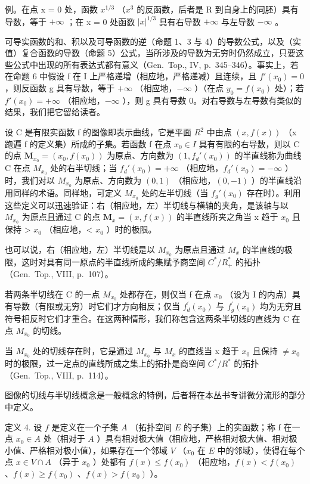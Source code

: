 例。在点 x = 0 处，函数 \(x^{1/3}\) （\(x^{3}\) 的反函数，后者是 R 到自身上的同胚）具有导数，等于 \(+\infty\) ；在 x = 0 处函数 \(|x|^{1/3}\) 具有右导数 \(+\infty\) 与左导数 \(-\infty\) 。

可导实函数的和、积以及可导函数的逆（命题 1、3 与 4）的导数公式，以及（实值）复合函数的导数（命题 5）公式，当所涉及的导数为无穷时仍然成立，只要这些公式中出现的所有表达式都有意义（Gen.~Top., IV, p.~345--346）。事实上，若在命题 6 中假设 f 在 I 上严格递增（相应地，严格递减）且连续，且 \(f'(x_{0}) = 0\) ，则反函数 g 具有导数，等于 \(+\infty\) （相应地，\(-\infty\) ）（在点 \(y_{0} = f(x_{0})\) 处）；若 \(f'(x_{0}) = +\infty\) （相应地，\(-\infty\) ），则 g 具有导数 0。对右导数与左导数有类似的结果，我们把它留给读者。

设 C 是有限实函数 f 的图像即表示曲线，它是平面 \(R^{2}\) 中由点 \((x, f(x))\) （x 跑遍 f 的定义集）所成的子集。若函数 f 在点 \(x_{0} \in I\) 具有有限的右导数，则以 C 的点 \(\mathbf{M}_{x_{0}} = (x_{0}, f(x_{0}))\) 为原点、方向数为 \((1, f_{d}'(x_{0}))\) 的半直线称为曲线 C 在点 \(M_{x_{0}}\) 处的右半切线；当 \(f_{d}'(x_{0}) = +\infty\) （相应地，\(f_{d}'(x_{0}) = -\infty\) ）时，我们对以 \(M_{x_{0}}\) 为原点、方向数为 \((0, 1)\) （相应地，\((0, -1)\) ）的半直线沿用同样的术语。同样地，可定义 \(M_{x_{0}}\) 处的左半切线（当 \(f_{g}'(x_{0})\) 存在时）。利用这些定义可以迅速验证：右（相应地，左）半切线与横轴的夹角，是该轴与以 \(M_{x_{0}}\) 为原点且通过 C 的点 \(\mathbf{M}_{x} = (x, f(x))\) 的半直线所夹之角当 x 趋于 \(x_{0}\) 且保持 \textgreater{} \(x_{0}\) （相应地，\textless{} \(x_{0}\) ）时的极限。

也可以说，右（相应地，左）半切线是以 \(M_{x_{0}}\) 为原点且通过 \(M_{x}\) 的半直线的极限，这时对具有同一原点的半直线所成的集赋予商空间 \(C^{*}/R_{+}^{*}\) 的拓扑（Gen.~Top., VIII, p.~107）。

若两条半切线在 C 的一点 \(M_{x_{0}}\) 处都存在，则仅当 f 在点 \(x_{0}\) （设为 I 的内点）具有导数（有限或无穷）时它们才方向相反；仅当 \(f_{d}^{\prime}(x_{0})\) 与 \(f_{g}^{\prime}(x_{0})\) 均为无穷且符号相反时它们才重合。在这两种情形，我们称包含这两条半切线的直线为 C 在点 \(M_{x_{0}}\) 的切线。

当 \(M_{x_{0}}\) 处的切线存在时，它是通过 \(M_{x_{0}}\) 与 \(M_{x}\) 的直线当 x 趋于 \(x_{0}\) 且保持 \(\neq x_{0}\) 时的极限，过一定点的直线所成之集上的拓扑是商空间 \(C^{*}/R^{*}\) 的拓扑（Gen.~Top., VIII, p.~114）。

图像的切线与半切线概念是一般概念的特例，后者将在本丛书专讲微分流形的部分中定义。

定义 4. 设 \(f\) 是定义在一个子集 \(A\) （拓扑空间 \(E\) 的子集）上的实函数；称 f 在一点 \(x_0 \in A\) 处（相对于 \(A\) ）具有相对极大值（相应地，严格相对极大值、相对极小值、严格相对极小值），如果存在一个邻域 \(V\) （\(x_0\) 在 \(E\) 中的邻域），使得在每个点 \(x \in V \cap A\) （异于 \(x_0\) ）处都有 \(f(x) \leqslant f(x_0)\) （相应地，\(f(x) < f(x_0)\) 、\(f(x) \geqslant f(x_0)\) 、\(f(x) > f(x_0)\) ）。

